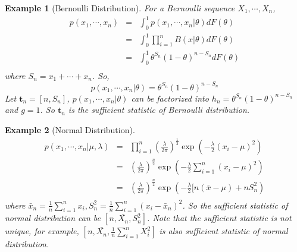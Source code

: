 \documentclass[11pt]{article}
\def\t{{\bm t}}
\newtheorem{example}{Example}[section]
\begin{document}
\begin{example}[Bernoulli Distribution] For a Bernoulli sequence $X_1, \cdots, X_n$,
\begin{eqnarray*}
p(x_1, \cdots, x_n) &=& \int_0^1p(x_1, \cdots, x_n | \theta) dF(\theta) \\
&=& \int_0^1\prod_{i=1}^{n}B(x|\theta) dF(\theta) \\
&=& \int_0^1\theta^{S_n} (1-\theta)^{n-S_n}dF(\theta) \\
\end{eqnarray*}
where $S_n = x_1+\cdots+x_n$.
So, 
$$
p(x_1, \cdots, x_n | \theta) = \theta^{S_n} (1-\theta)^{n-S_n}
$$
Let $\t_n=[n, S_n]$,  $p(x_1, \cdots, x_n | \theta)$ can be factorized into $h_n=\theta^{S_n} (1-\theta)^{n-S_n}$ and $g=1$. So $\t_n$ is the sufficient statistic of Bernoulli distribution.
\end{example}
\begin{example}[Normal Distribution]
\begin{eqnarray*}
p(x_1, \cdots, x_n | \mu, \lambda) &=& \prod_{i=1}^{n}(\frac{\lambda}{2\pi})^{\frac{1}{2}}\exp(-\frac{\lambda}{2}(x_i-\mu)^2) \\
&=& (\frac{\lambda}{2\pi})^{\frac{n}{2}}\exp(-\frac{\lambda}{2}\sum_{i=1}^{n}(x_i-\mu)^2) \\
&=& (\frac{\lambda}{2\pi})^{\frac{n}{2}}\exp(-\frac{\lambda}{2}[n(\bar{x}-\mu)+nS_n^2) \\
\end{eqnarray*}
where $\bar{x}_n=\frac{1}{n}\sum_{i=1}^{n}x_i, S^2_n=\frac{1}{n}\sum_{i=1}^{n}(x_i-\bar{x}_n)^2$.
So the sufficient statistic of normal distribution can be $[n, \bar{X_n}, S_n^2]$. Note that the sufficient statistic is not unique, for example, $[n, \bar{X_n}, \frac{1}{n}\sum_{i=1}^{n}X_i^2]$ is also sufficient statistic of normal distribution.
\end{example}
\end{document}
